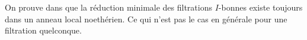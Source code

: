 \begin{maremarque}
	On prouve dans \cite{Di2} que la réduction minimale des filtrations $I$-bonnes existe toujours dans un anneau local noethérien. Ce qui n'est pas le cas en générale pour une filtration quelconque.
\end{maremarque}
%
%
%
%	
%	
%	
